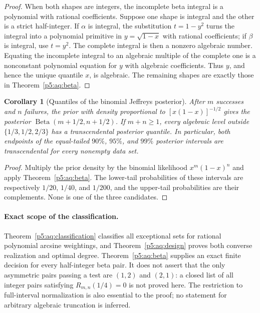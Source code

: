 \documentclass[11pt,a4paper]{article}
\newtheorem{corollary}[theorem]{Corollary}
\theoremstyle{definition}
\theoremstyle{remark}
\numberwithin{equation}{section}
\begin{document}
\begin{proof}
When both shapes are integers, the incomplete beta integral
is a polynomial with rational coefficients.
Suppose one shape is integral and the other is a strict
half-integer. If $\alpha$ is integral, the substitution
$t=1-y^2$ turns the integral into a polynomial primitive in
$y=\sqrt{1-x}$ with rational coefficients; if $\beta$ is
integral, use $t=y^2$.
The complete integral is then a nonzero algebraic number.
Equating the incomplete integral to an algebraic multiple of
the complete one is a nonconstant polynomial equation for
$y$ with algebraic coefficients. Thus $y$, and hence the
unique quantile $x$, is algebraic.
The remaining shapes are exactly those in
Theorem~\ref{p5:aq:beta}.
\end{proof}

\begin{corollary}[Quantiles of the binomial Jeffreys posterior]
\label{p5:aq:jeffreys}
After $m$ successes and $n$ failures, the prior with density
proportional to $[x(1-x)]^{-1/2}$ gives the posterior
$\operatorname{Beta}(m+1/2,n+1/2)$.
If $m+n\ge1$, every algebraic level outside
$\{1/3,1/2,2/3\}$ has a transcendental posterior quantile.
In particular, both endpoints of the equal-tailed
$90\%$, $95\%$, and $99\%$ posterior intervals are
transcendental for every nonempty data set.
\end{corollary}

\begin{proof}
Multiply the prior density by the binomial likelihood
$x^m(1-x)^n$ and apply Theorem~\ref{p5:aq:beta}.
The lower-tail probabilities of these intervals are respectively
$1/20$, $1/40$, and $1/200$, and the upper-tail probabilities
are their complements. None is one of the three candidates.
\end{proof}

\paragraph{Exact scope of the classification.}
Theorem~\ref{p5:aq:classification} classifies all exceptional sets
for rational polynomial arcsine weightings, and
Theorem~\ref{p5:aq:design} proves both converse realization and
optimal degree. Theorem~\ref{p5:aq:beta} supplies an exact finite
decision for every half-integer beta pair. It does not assert
that the only asymmetric pairs passing a test are $(1,2)$
and $(2,1)$: a closed list of all integer pairs satisfying
$R_{m,n}(1/4)=0$ is not proved here.
The restriction to full-interval normalization is also essential
to the proof; no statement for arbitrary algebraic truncation
is inferred.
\end{document}
